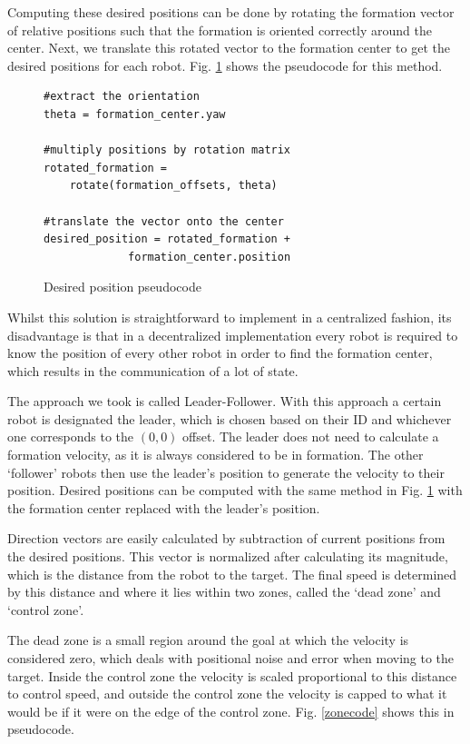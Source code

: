 \documentclass[letterpaper, 10 pt, conference]{ieeeconf}  %
\begin{document}
Computing these desired positions can be done by rotating the formation vector of relative positions such that the formation is oriented correctly around the center. Next, we translate this rotated vector to the formation center to get the desired positions for each robot. Fig. \ref{desiredpositioncode} shows the pseudocode for this method.

\begin{figure}[thpb]
\centering
\lstset{language=python}
\begin{lstlisting}
#extract the orientation
theta = formation_center.yaw

#multiply positions by rotation matrix
rotated_formation =
    rotate(formation_offsets, theta)
    
#translate the vector onto the center
desired_position = rotated_formation +
             formation_center.position
\end{lstlisting}
\caption{Desired position pseudocode}
\label{desiredpositioncode}
\end{figure}

Whilst this solution is straightforward to implement in a centralized fashion, its disadvantage is that in a decentralized implementation every robot is required to know the position of every other robot in order to find the formation center, which results in the communication of a lot of state.

The approach we took is called Leader-Follower. With this approach a certain robot is designated the leader, which is chosen based on their ID and whichever one corresponds to the $(0,0)$ offset. The leader does not need to calculate a formation velocity, as it is always considered to be in formation. The other `follower' robots then use the leader's position to generate the velocity to their position. Desired positions can be computed with the same method in Fig. \ref{desiredpositioncode} with the formation center replaced with the leader's position.

Direction vectors are easily calculated by subtraction of current positions from the desired positions. This vector is normalized after calculating its magnitude, which is the distance from the robot to the target. The final speed is determined by this distance and where it lies within two zones, called the `dead zone' and `control zone'.

The dead zone is a small region around the goal at which the velocity is considered zero, which deals with positional noise and error when moving to the target. Inside the control zone the velocity is scaled proportional to this distance to control speed, and outside the control zone the velocity is capped to what it would be if it were on the edge of the control zone. Fig. \ref{zonecode} shows this in pseudocode.
\end{document}

